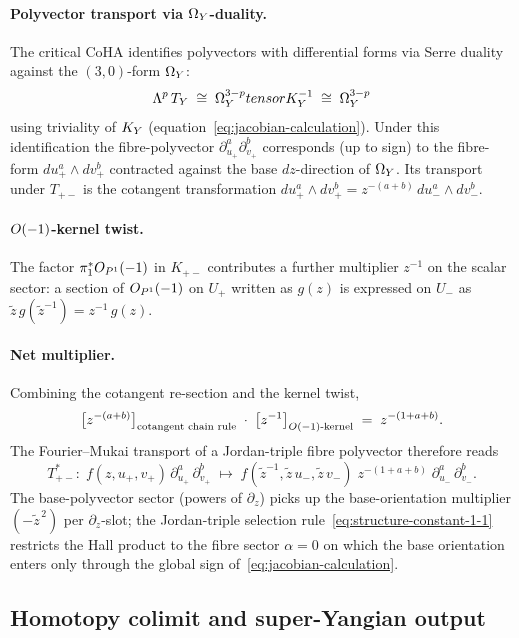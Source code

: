 \paragraph{Polyvector transport via $\Omega_{Y}$-duality.}
The critical CoHA identifies polyvectors with differential forms via
Serre duality against the $(3,0)$-form $\Omega_{Y}$:
\[
  \Lambda^p\, T_{Y} \;\cong\; \Omega^{3-p}_{Y} tensor K_{Y}^{-1}
  \;\cong\; \Omega^{3-p}_{Y}
\]
using triviality of $K_{Y}$ (equation~\eqref{eq:jacobian-calculation}).
Under this identification the fibre-polyvector $\partial_{u_+}^a
\partial_{v_+}^b$ corresponds (up to sign) to the fibre-form
$du_+^a \wedge dv_+^b$ contracted against the base $dz$-direction of
$\Omega_{Y}$.  Its transport under $T_{+-}$ is the cotangent transformation
$du_+^a \wedge dv_+^b = z^{-(a+b)}\, du_-^a \wedge dv_-^b$.

\paragraph{$O(-1)$-kernel twist.}
The factor $\pi_1^*O_{P^1}(-1)$ in $K_{+-}$ contributes a further
multiplier $z^{-1}$ on the scalar sector: a section of
$O_{P^1}(-1)$ on $U_+$ written as $g(z)$ is expressed on $U_-$ as
$\tilde z\, g(\tilde z^{-1}) = z^{-1}\, g(z)$.

\paragraph{Net multiplier.}
Combining the cotangent re-section and the kernel twist,
\[
  \bigl[z^{-(a+b)}\bigr]_{\text{cotangent chain rule}}
    \;\cdot\;
  \bigl[z^{-1}\bigr]_{O(-1)\text{-kernel}}
  \;=\;
  z^{-(1 + a + b)}.
\]
The Fourier--Mukai transport of a Jordan-triple fibre polyvector therefore
reads
\begin{equation}\label{eq:FM-multiplier}
  T_{+-}^* :\;
  f(z, u_+, v_+)\, \partial_{u_+}^a\, \partial_{v_+}^b
  \;\longmapsto\;
  f(\tilde z^{-1}, \tilde z\, u_-, \tilde z\, v_-)\;
  z^{-(1 + a + b)}\;
  \partial_{u_-}^a\, \partial_{v_-}^b.
\end{equation}
The base-polyvector sector (powers of $\partial_z$) picks up the
base-orientation multiplier $(-\tilde z^{\,2})$ per $\partial_z$-slot; the
Jordan-triple selection rule~\eqref{eq:structure-constant-1-1} restricts
the Hall product to the fibre sector $\alpha = 0$ on which the base
orientation enters only through the global sign
of~\eqref{eq:jacobian-calculation}.

\subsection{Homotopy colimit and super-Yangian output}


